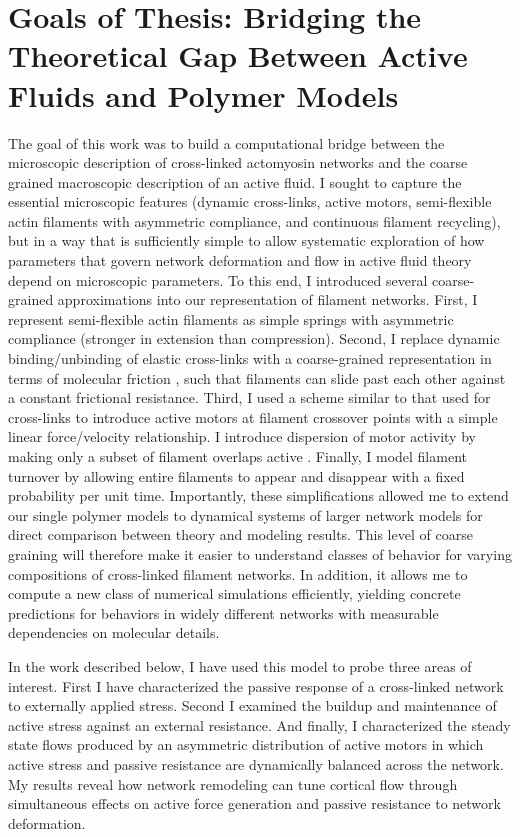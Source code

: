 \section{Goals of Thesis: Bridging the Theoretical Gap Between Active Fluids and Polymer Models}
The goal of this work was to build a computational bridge between the microscopic description of cross-linked actomyosin networks and the coarse grained macroscopic description of an active fluid.  I sought to capture the essential microscopic features (dynamic cross-links, active motors, semi-flexible actin filaments with asymmetric compliance, and continuous filament recycling), but in a way that is sufficiently simple to allow systematic exploration of how parameters that govern network deformation and flow in active fluid theory depend on microscopic parameters. To this end, I introduced several coarse-grained approximations into our representation of filament networks. First, I represent semi-flexible actin filaments as simple springs with asymmetric compliance (stronger in extension than compression). Second, I replace dynamic binding/unbinding of elastic cross-links with a coarse-grained representation in terms of molecular friction \cite{theo_friction,theo_frictionSam,theo_molefric}, such that filaments can slide past each other against a constant frictional resistance. Third, I used a scheme similar to that used for cross-links to introduce active motors at filament crossover points with a simple linear force/velocity relationship.  I introduce dispersion of motor activity by making only a subset of filament overlaps active \cite{theo_frictionShila}.  Finally, I model filament turnover by allowing entire filaments to appear and disappear with a fixed probability per unit time. Importantly, these simplifications allowed me to extend our single polymer models to dynamical systems of larger network models for direct comparison between theory and modeling results. This level of coarse graining will therefore make it easier to understand classes of behavior for varying compositions of cross-linked filament networks. In addition, it allows me to compute a new class of numerical simulations efficiently, yielding concrete predictions for behaviors in widely different networks with measurable dependencies on molecular details.

In the work described below, I have used this model to probe three areas of interest. First I have characterized the passive response of a cross-linked network to externally applied stress. Second I examined the buildup and maintenance of active stress against an external resistance. And finally, I characterized the steady state flows produced by an asymmetric distribution of active motors in which active stress and passive resistance are dynamically balanced across the network.  My results reveal how network remodeling can tune cortical flow through simultaneous effects on active force generation and passive resistance to network deformation.




